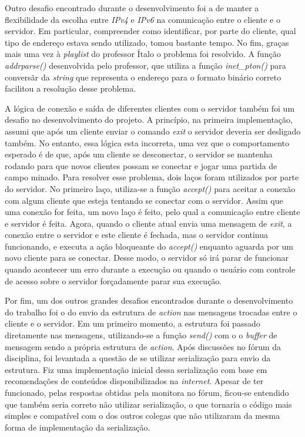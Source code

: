 \documentclass{article}
\begin{document}
Outro desafio encontrado durante o desenvolvimento foi a de manter a
flexibilidade da escolha entre \textit{IPv4} e \textit{IPv6} na comunicação
entre o cliente e o servidor. Em particular, compreender como identificar, por
parte do cliente, qual tipo de endereço estava sendo utilizado, tomou bastante
tempo. No fim,
graças mais uma vez à \textit{playlist} do professor Ítalo o problema foi
resolvido. A função \textit{addrparse()} desenvolvida pelo professor, que
utiliza a função \textit{inet\_pton()} para conversãr da \textit{string} que
representa o endereço para o formato binário correto
facilitou a resolução desse problema.

A lógica de conexão e saída de diferentes clientes com o servidor também foi um
desafio no desenvolvimento do projeto. A princípio,
na primeira implementação, assumi que após um cliente enviar o comando
\textit{exit} o servidor deveria ser desligado também. No entanto, essa lógica
esta
incorreta, uma vez que o comportamento esperado é de que, após um cliente se
desconectar, o servidor se mantenha rodando para que novos clientes possam se
conectar e jogar uma partida de
campo minado. Para resolver esse problema, dois laços foram utilizados por
parte do servidor. No primeiro laço, utiliza-se a função \textit{accept()} para
aceitar a conexão com
algum cliente que esteja tentando se conectar com o servidor. Assim que uma
conexão for feita, um novo laço é feito, pelo qual a comunicação entre cliente
e servidor é feita. Agora, quando
o cliente atual envia uma mensagem de \textit{exit}, a conexão entre o servidor
e este cliente é fechada, mas o servidor continua funcionando, e executa a ação
bloqueante do \textit{accept()} enquanto aguarda por um novo cliente para
se conectar. Desse modo, o servidor só irá parar de funcionar quando acontecer
um erro durante a execução ou quando o usuário com controle de acesso sobre o
servidor forçadamente parar sua execução.

Por fim, um dos outros grandes desafios encontrados durante o desenvolvimento
do trabalho foi o do envio da estrutura de \textit{action} nas mensagens
trocadas entre
o cliente e o servidor. Em um primeiro momento, a estrutura foi passado
diretamente nas mensagens, utilizando-se a função \textit{send()} com o o \textit{buffer} de mensagem
sendo a própria estrutura de \textit{action}. Após discussões no fórum da disciplina, foi levantada a questão de se utilizar
serialização para envio da estrutura. Fiz uma implementação inicial dessa serialização com base em recomendações de conteúdos
disponibilizados na \textit{internet}. Apesar de ter funcionado, pelas respostas obtidas pela monitora no fórum, ficou-se entendido que
também seria correto não utilizar serialização, o que tornaria o código mais simples e compatível com o dos outros colegas que não utilizaram
da mesma forma de implementação da serialização.
\end{document}
